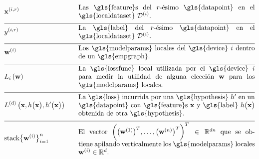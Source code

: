 \begin{align} 
	&\featurevec^{(\nodeidx,\sampleidx)} & \quad & \parbox{.75\textwidth}{Las \gls{feature}s del $\sampleidx$-ésimo \gls{datapoint} en 
	el \gls{localdataset} $\localdataset{\nodeidx}$.} \nonumber \\[2mm] \hline \nonumber\\[-5mm]
&\truelabel^{(\nodeidx,\sampleidx)} & \quad & \parbox{.75\textwidth}{La \gls{label} del $\sampleidx$-ésimo \gls{datapoint} en 
	el \gls{localdataset} $\localdataset{\nodeidx}$.} \nonumber \\[2mm] \hline \nonumber\\[-5mm]
	&\localparams{\nodeidx} & \quad & \parbox{.75\textwidth}{Los \gls{modelparams} locales del \gls{device} $\nodeidx$ dentro de un \gls{empgraph}.} \nonumber \\[2mm] \hline \nonumber\\[-5mm]
	&\locallossfunc{\nodeidx}{\weights} & \quad & \parbox{.75\textwidth}{La \gls{lossfunc} local utilizada por el \gls{device} $\nodeidx$ 
	para medir la utilidad de alguna elección $\weights$ para los \gls{modelparams} locales.}\nonumber \\[2mm] \hline \nonumber\\[-5mm]
& \gtvloss{\featurevec}{\hypothesis\big(\featurevec\big)}{\hypothesis'\big(\featurevec\big)}& \quad & \parbox{.75\textwidth}{La \gls{loss} 
	incurrida por una \gls{hypothesis} $\hypothesis'$ en un \gls{datapoint} con \gls{feature}s $\featurevec$ y \gls{label} 
	$\hypothesis\big( \featurevec\big)$ obtenida de otra \gls{hypothesis}.}\nonumber \\[2mm] \hline \nonumber\\[-5mm]
	& 	{\rm stack} \big\{ \weights^{(\nodeidx)} \big\}_{\nodeidx=1}^{\nrnodes} & \quad & \parbox{.75\textwidth}{El vector $\bigg( \big(\weights^{(1)}  \big)^{T}, \ldots, \big(\weights^{(\nrnodes)}  \big)^{T} \bigg)^{T} \in \mathbb{R}^{\dimlocalmodel\nrnodes}$ que 
		se obtiene apilando verticalmente los \gls{modelparams} locales $\weights^{(\nodeidx)} \in \mathbb{R}^{\dimlocalmodel}$.} \nonumber  
\end{align}        

